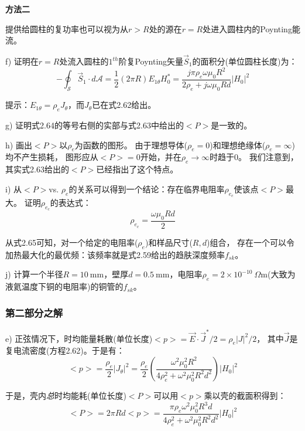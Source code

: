 \textbf{方法二}

提供给圆柱的复功率也可以视为从$r>R$处的源在$r=R$处进入圆柱内的Poynting能流。

f) 证明在$r=R$处流入圆柱的$1^{th}$阶复Poynting矢量$\vec{S}_1$的面积分(单位圆柱长度)为：
\begin{equation}
-\oint_{\mathcal{S}}\vec{S}_1 \cdot d\mathcal{A}=\frac{1}{2}(2\pi R)E_{1\theta} H_0^*=\frac{j\pi\rho_e\omega\mu_0 R^2}{2\rho_e+j\omega\mu_0 R d}|H_0|^2
\end{equation}

提示：$E_{1\theta}=\rho_e J_\theta$，而$J_\theta$已在式2.62给出。

g) 证明式2.64的等号右侧的实部与式2.63中给出的$<P>$是一致的。

h) 画出$<P>$以$\rho_e$为函数的图形。
由于理想导体($\rho_e=0$)和理想绝缘体($\rho_e=\infty$)均不产生损耗，
图形应从$<P>=0$开始，并在$\rho_e \rightarrow \infty$时趋于0。
我们注意到，其实式2.63给出的$<P>$已经指出了这个特点。

i) 从$<P>$vs. $\rho_e$的关系可以得到一个结论：存在临界电阻率$\rho_{e_c}$使该点$<P>$最大。
证明$\rho_{e_c}$的表达式：
\begin{equation}
\rho_{e_c}=\frac{\omega \mu_0 R d}{2}
\end{equation}

从式2.65可知，对一个给定的电阻率($\rho_e$)和样品尺寸($R,d$)组合，
存在一个可以令加热最大化的最优频：该频率就是式2.59给出的趋肤深度频率$f_{sk}$。

j) 计算一个半径$R=10\ \mathrm{mm}$，壁厚$d=0.5\ \mathrm{mm}$，电阻率$\rho_e=2\times 10^{-10}\ \Omega\mathrm{m}$(大致为液氦温度下铜的电阻率)的铜管的$f_{sk}$。

\subsubsection*{第二部分之解}
e) 正弦情况下，时均能量耗散(单位长度)$<p>=\vec{E}\cdot \vec{J}^* /2=\rho_e |J|^2 /2$，
其中$\vec{J}$是复电流密度(方程2.62)。于是有：
\begin{equation*}
<p>=\frac{\rho_e}{2}|J_\theta|^2=\frac{\rho_e}{2}\left(\frac{\omega^2 \mu_0^2 R^2}{4\rho_e^2+\omega^2 \mu_0^2 R^2 d^2}\right)|H_0|^2 \tag{S7.9}
\end{equation*}

于是，壳内\textit{总}时均能耗(单位长度)$<P>$可以用$<p>$乘以壳的截面积得到：
\begin{equation*}
<P>=2\pi R d<p>=\frac{\pi \rho_e \omega^2 \mu_0^2 R^3 d}{4\rho_e^2+\omega^2 \mu_0^2 R^2 d^2}|H_0|^2 \tag{2.63}
\end{equation*}

